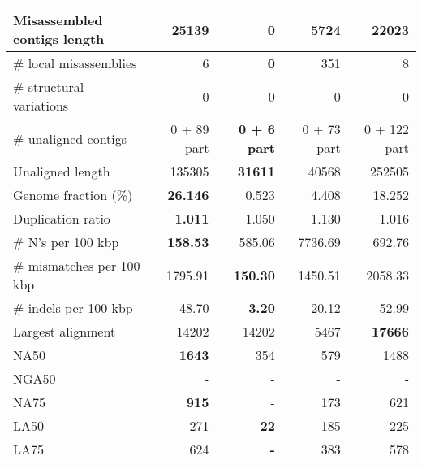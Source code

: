 \documentclass[12pt,a4paper]{article}
\begin{document}
\begin{table}[ht]
\begin{center}
\begin{tabular}{|l*{4}{|r}|}
Misassembled contigs length & 25139 & {\bf 0} & 5724 & 22023 \\ \hline
\# local misassemblies & 6 & {\bf 0} & 351 & 8 \\ \hline
\# structural variations & 0 & 0 & 0 & 0 \\ \hline
\# unaligned contigs & 0 + 89 part & {\bf 0 + 6 part} & 0 + 73 part & 0 + 122 part \\ \hline
Unaligned length & 135305 & {\bf 31611} & 40568 & 252505 \\ \hline
Genome fraction (\%) & {\bf 26.146} & 0.523 & 4.408 & 18.252 \\ \hline
Duplication ratio & {\bf 1.011} & 1.050 & 1.130 & 1.016 \\ \hline
\# N's per 100 kbp & {\bf 158.53} & 585.06 & 7736.69 & 692.76 \\ \hline
\# mismatches per 100 kbp & 1795.91 & {\bf 150.30} & 1450.51 & 2058.33 \\ \hline
\# indels per 100 kbp & 48.70 & {\bf 3.20} & 20.12 & 52.99 \\ \hline
Largest alignment & 14202 & 14202 & 5467 & {\bf 17666} \\ \hline
NA50 & {\bf 1643} & 354 & 579 & 1488 \\ \hline
NGA50 & - & - & - & - \\ \hline
NA75 & {\bf 915} & - & 173 & 621 \\ \hline
LA50 & 271 & {\bf 22} & 185 & 225 \\ \hline
LA75 & 624 & {\bf -} & 383 & 578 \\ \hline
\end{tabular}
\end{center}
\end{table}
\end{document}
